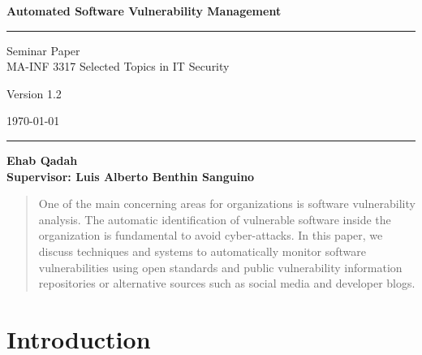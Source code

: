 \documentclass{llncs}
\begin{document}
\begin{flushleft}
 
 \thispagestyle{empty}
\centering\LARGE {\bf Automated Software Vulnerability Management}


\rule{\textwidth}{1pt}

\vspace{2pt}


\centering
 Seminar Paper  
 \\MA-INF 3317 Selected Topics in IT Security

{\Large Version 1.2 }

\vspace{8pt}
\today

\rule{\textwidth}{1pt}

\vspace{8 cm}

\centering
 \bf Ehab Qadah\\
 
 \vspace{7 pt}
\bf Supervisor: Luis Alberto Benthin Sanguino

\end{flushleft}


\newpage

\tableofcontents

\newpage


\begin{abstract}
One of the main concerning areas for organizations is software vulnerability analysis. The automatic identification of vulnerable software inside the organization is fundamental to avoid cyber-attacks. In this paper, we discuss techniques and systems to automatically monitor software vulnerabilities using open standards and public vulnerability information repositories or alternative sources such as social media and developer blogs. 
\end{abstract}

\section{Introduction}
\end{document}
